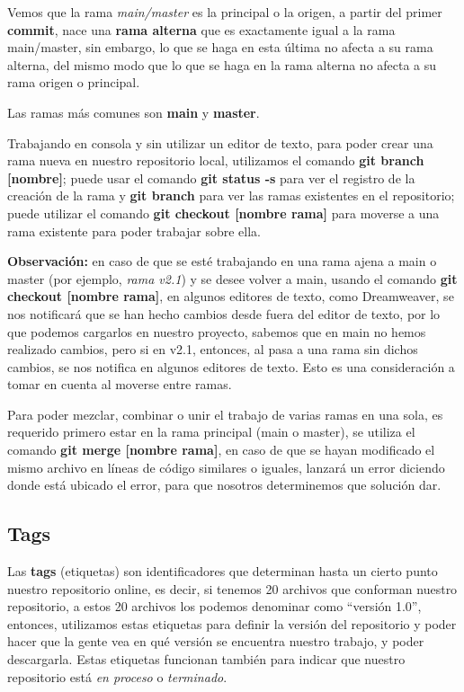 Vemos que la rama \textit{main/master} es la principal o la origen, a partir del primer \textbf{commit}, nace una \textbf{rama alterna} que es exactamente igual a la rama main/master, sin embargo, lo que se haga en esta última no afecta a su rama alterna, del mismo modo que lo que se haga en la rama alterna no afecta a su rama origen o principal.

Las ramas más comunes son \textbf{main} y \textbf{master}.

Trabajando en consola y sin utilizar un editor de texto, para poder crear una rama nueva en nuestro repositorio local, utilizamos el comando \textbf{git branch [nombre]}; puede usar el comando \textbf{git status -s} para ver el registro de la creación de la rama y \textbf{git branch} para ver las ramas existentes en el repositorio; puede utilizar el comando \textbf{git checkout [nombre rama]} para moverse a una rama existente para poder trabajar sobre ella.

\textbf{Observación:} en caso de que se esté trabajando en una rama ajena a main o master (por ejemplo, \textit{rama v2.1}) y se desee volver a main, usando el comando \textbf{git checkout [nombre rama]}, en algunos editores de texto, como Dreamweaver, se nos notificará que se han hecho cambios desde fuera del editor de texto, por lo que podemos cargarlos en nuestro proyecto, sabemos que en main no hemos realizado cambios, pero si en v2.1, entonces, al pasa a una rama sin dichos cambios, se nos notifica en algunos editores de texto. Esto es una consideración a tomar en cuenta al moverse entre ramas.

Para poder mezclar, combinar o unir el trabajo de varias ramas en una sola, es requerido primero estar en la rama principal (main o master), se utiliza el comando \textbf{git merge [nombre rama]}, en caso de que se hayan modificado el mismo archivo en líneas de código similares o iguales, lanzará un error diciendo donde está ubicado el error, para que nosotros determinemos que solución dar.


\subsection{Tags}
\hspace{0.55cm}Las \textbf{tags} (etiquetas) son identificadores que determinan hasta un cierto punto nuestro repositorio online, es decir, si tenemos 20 archivos que conforman nuestro repositorio, a estos 20 archivos los podemos denominar como “versión 1.0”, entonces, utilizamos estas etiquetas para definir la versión del repositorio y poder hacer que la gente vea en qué versión se encuentra nuestro trabajo, y poder descargarla. Estas etiquetas funcionan también para indicar que nuestro repositorio está \textit{en proceso} o \textit{terminado}.

